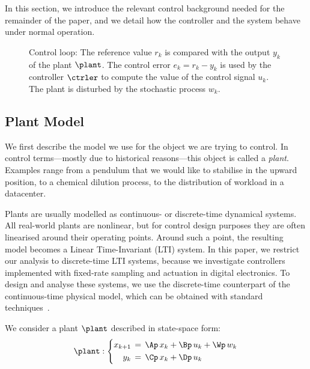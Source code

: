 In this section, we introduce the relevant control background needed for the remainder of the paper, and we detail how the controller and the system behave under normal operation.

\begin{figure}[t]
\centering

\caption{Control loop: The reference value $r_k$ is compared with the output $y_k$ of the plant $\plant$.
    The control error $e_k = r_k - y_k$ is used by the controller $\ctrler$ to compute the value of the control signal $u_k$.
    The plant is disturbed by the stochastic process $w_k$.}
\label{fig:loop}
\end{figure}

\subsection{Plant Model}

We first describe the model we use for the object we are trying to control.
In control terms---mostly due to historical reasons---this object is called a \emph{plant}.
Examples range from a pendulum that we would like to stabilise in the upward position, to a chemical dilution process, to the distribution of workload in a datacenter.

Plants are usually modelled as continuous- or discrete-time dynamical systems. 
All real-world plants are nonlinear, but for control design purposes they are often linearised around their operating points.
Around such a point, the resulting model becomes a Linear Time-Invariant (LTI) system.
In this paper, we restrict our analysis to discrete-time LTI systems, because we investigate controllers implemented with fixed-rate sampling and actuation in digital electronics.
To design and analyse these systems, we use the discrete-time counterpart of the continuous-time physical model, which can be obtained with standard techniques~\cite{Astrom:1997}.

We consider a plant $\plant$ described in state-space form:
\begin{equation}
\label{eq:background:plant}
    \plant : \left\{
    \begin{aligned}
        x_{k+1} &\,=\,  \Ap\,x_k + \Bp\,u_k + \Wp\,w_k \\
        y_k &\,=\, \Cp\,x_k + \Dp\,u_k
    \end{aligned}
    \right.
\end{equation}

